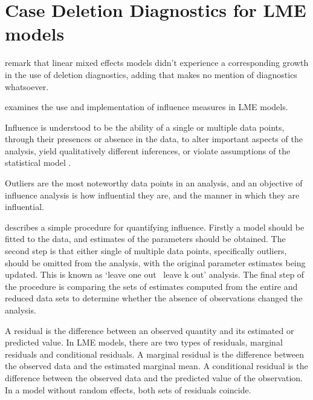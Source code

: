 \documentclass[12pt, a4paper]{report}
\begin{document}



\section{Case Deletion Diagnostics for LME models}

\citet{HaslettDillane} remark that linear mixed effects models
didn't experience a corresponding growth in the use of deletion
diagnostics, adding that \citet{McCullSearle} makes no mention of
diagnostics whatsoever.

\citet{schabenberger} examines the use and implementation of
influence measures in LME models.

Influence is understood to be the ability of a single or multiple
data points, through their presences or absence in the data, to
alter important aspects of the analysis, yield qualitatively
different inferences, or violate assumptions of the statistical
model \citep{schabenberger}.

Outliers are the most noteworthy data points in an analysis, and
an objective of influence analysis is how influential they are,
and the manner in which they are influential.

\citet{schabenberger} describes a simple procedure for quantifying
influence. Firstly a model should be fitted to the data, and
estimates of the parameters should be obtained. The second step is
that either single of multiple data points, specifically outliers,
should be omitted from the analysis, with the original parameter
estimates being updated. This is known as `leave one out \ leave k
out' analysis. The final step of the procedure is comparing the
sets of estimates computed from the entire and reduced data sets
to determine whether the absence of observations changed the
analysis.



A residual is the difference between an observed quantity and its
estimated or predicted value. In LME models, there are two types
of residuals, marginal residuals and conditional residuals. A
marginal residual is the difference between the observed data and
the estimated marginal mean. A conditional residual is the
difference between the observed data and the predicted value of
the observation. In a model without random effects, both sets of
residuals coincide.
\end{document}
